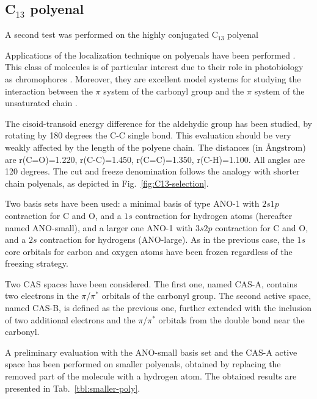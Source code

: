 \subsection{C$_{13}$ polyenal}

A second test was performed on the highly conjugated C$_{13}$ polyenal


\vspace{-5mm}
Applications of the localization technique on polyenals have been performed
\cite{mp-101-1389-2003,cpl-372-22-2003,ijqc-97-688-2004}.
This class of molecules is of particular interest due to their role in
photobiology as chromophores \cite{jacs-118-7790-1996}.
Moreover, they are excellent model systems for studying
the interaction between the $\pi$ system of the carbonyl group and the
$\pi$ system of the unsaturated chain \cite{tetrahedron-34-3591-1978}. 

The cisoid-transoid energy difference for the aldehydic group has been
studied, by rotating by 180 degrees the C-C single bond. This evaluation
should be very weakly affected by the length of the polyene chain. The
distances (in $\mbox{{\AA}ngstrom}$) are r(C=O)=1.220, r(C-C)=1.450,
r(C=C)=1.350, r(C-H)=1.100.  All angles are 120 degrees.  The cut and freeze
denomination follows the analogy with shorter chain polyenals, as depicted
in Fig.~\ref{fig:C13-selection}.



Two basis sets have been used: a minimal basis of type ANO-1 with $2s1p$
contraction for C and O, and a $1s$ contraction for hydrogen atoms
(hereafter named ANO-small), and a larger one ANO-1 with $3s2p$ contraction
for C and O, and a $2s$ contraction for hydrogens (ANO-large). As in the
previous case, the $1s$ core orbitals for carbon and oxygen atoms have been
frozen regardless of the freezing strategy.

Two CAS spaces have been considered. The first one, named CAS-A, contains
two electrons in the $\pi$/$\pi^{*}$ orbitals of the carbonyl group. The
second active space, named CAS-B, is defined as the previous one, further
extended with the inclusion of two additional electrons and the
$\pi$/$\pi^{*}$ orbitals from the double bond near the carbonyl. 

A preliminary evaluation with the ANO-small basis set and the CAS-A active
space has been performed on smaller polyenals, obtained by replacing the
removed part of the molecule with a hydrogen atom. The obtained results are
presented in Tab.~\ref{tbl:smaller-poly}.


